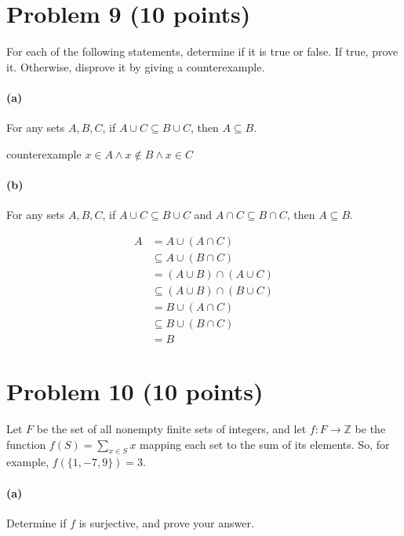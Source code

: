 \documentclass[english]{article}
\begin{document}
\section*{Problem 9 (10 points)}

For each of the following statements, determine if it is true or false.
If true, prove it. Otherwise, disprove it by giving a counterexample.

\paragraph{(a)}
For any sets $A,B,C$, if $A\cup C \subseteq B\cup C$, then $A \subseteq B$.

counterexample
$x \in A \land x \notin B \land x \in C$ 

\paragraph{(b)}
For any sets $A,B,C$, if $A\cup C \subseteq B\cup C$ and $A\cap C \subseteq B\cap C$,
then $A \subseteq B$.

\begin{align*}
  A &= A\cup (A \cap C) \\
  &\subseteq A\cup(B\cap C) \\
  &=(A \cup B)\cap (A\cup C) \\
  &\subseteq (A\cup B)\cap (B\cup C) \\
  &= B\cup(A \cap C) \\
  &\subseteq B\cup (B\cap C) \\
  &= B
\end{align*}


\section*{Problem 10 (10 points)}
Let $F$ be the set of all nonempty finite sets of integers, and let $f: F\to\mathbb{Z}$
be the function $f(S) = \sum_{x\in S} x$ mapping each set to the sum of its elements.
So, for example, $f(\{1,-7,9\}) = 3$.

\paragraph{(a)} Determine if $f$ is surjective, and prove your answer.
\end{document}
